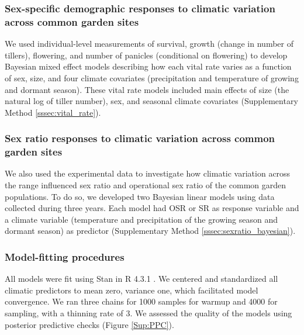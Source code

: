 \documentclass[12pt]{article}\usepackage[]{graphicx}\usepackage[dvipsnames]{xcolor}
\newcommand{\tom}[2]{{\color{red}{#1}}\footnote{\textit{\color{red}{#2}}}}
\begin{document}
\subsubsection*{Sex-specific demographic responses to climatic variation across common garden sites}
We used individual-level measurements of survival, growth (change in number of tillers), flowering, and number of panicles (conditional on flowering) to develop Bayesian mixed effect models describing how each vital rate varies as a function of sex, size, and four climate covariates (precipitation and temperature of growing and dormant season). 
These vital rate models included main effects of size (the natural log of tiller number), sex, and seasonal climate covariates (Supplementary Method \ref{sssec:vital_rate}). 

\subsubsection*{Sex ratio responses to climatic variation across common garden sites}
We also used the experimental data to investigate how climatic variation across the range influenced sex ratio and operational sex ratio of the common garden populations. 
To do so, we developed  two Bayesian linear models using  data collected during three years.
Each model had OSR or SR as response variable and a climate variable (temperature and precipitation of the growing season and dormant season) as predictor (Supplementary Method \ref{sssec:sexratio_bayesian}). 


\subsubsection*{Model-fitting procedures}
All models were fit using Stan \citep{rstan} in R 4.3.1 \citep{RCoreteam}.
We centered and standardized all climatic predictors to mean zero, variance one, which facilitated model convergence.
We ran three chains for 1000 samples for warmup and 4000 for sampling, with a thinning rate of 3.
We assessed the quality of the models using posterior predictive checks \citep{piironen2017comparison} (Figure \ref{Sup:PPC}).
 
\end{document}
